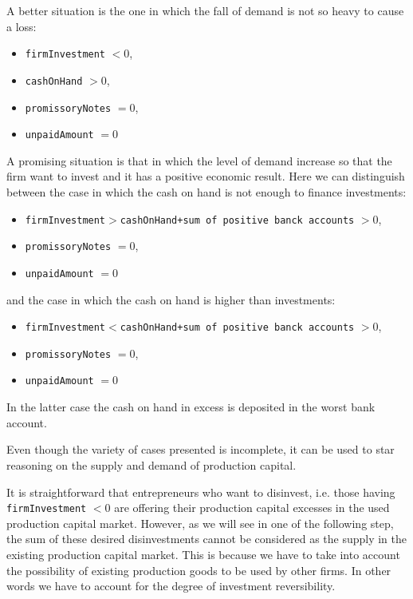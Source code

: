 \documentclass{book}
\begin{document}
A better situation is the one in which the fall of demand is not so heavy to cause a loss:\\
\begin{itemize}
	\item \verb+firmInvestment+ $<0$,
	\item \verb+cashOnHand+ $>0$,
	\item \verb+promissoryNotes+ $=0$,
	\item \verb+unpaidAmount+ $=0$
\end{itemize}

A promising situation is that in which the level of demand increase so that the firm want to invest and it has a positive economic result. Here we can distinguish between the case in which the cash on hand is not enough to finance investments:\\  
\begin{itemize}
	\item \verb+firmInvestment+$>$\verb|cashOnHand+sum of positive banck accounts| $>0$, 
	\item \verb+promissoryNotes+ $=0$, 
	\item \verb+unpaidAmount+ $=0$
\end{itemize}
and the case in which the cash on hand is higher than investments:\\
\begin{itemize}
	\item \verb+firmInvestment+$ < $\verb|cashOnHand+sum of positive banck accounts| $>0$, 
	\item \verb+promissoryNotes+ $=0$, 
	\item \verb+unpaidAmount+ $=0$
\end{itemize}
In the latter case the cash on hand in excess is deposited in the worst bank account.

Even though the variety of cases presented is incomplete, it can be used to star reasoning on the supply and demand of production capital.

It is straightforward that entrepreneurs who want to disinvest, i.e. those having \verb+firmInvestment+ $<0$ are offering their production capital excesses in the used production capital market. 
However, as we will see in one of the following step, the sum of these desired disinvestments cannot be considered as the supply in the existing production capital market. This is because we have to take into account the possibility of existing production goods to be used by other firms. In other words we have to account for the degree of investment reversibility.
\end{document}
